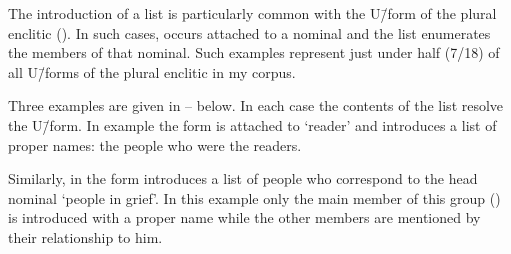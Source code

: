 The introduction of a list is particularly common with
the U\=/form of the plural enclitic  ().
In such cases,  occurs attached to a nominal
and the list enumerates the members of that nominal.
Such examples represent just under half (7/18) of all U\=/forms
of the plural enclitic  in my corpus.

Three examples are given in -- below.
In each case the contents of the list resolve the U\=/form.
In example  the form  is attached to 
`reader' and introduces a list of proper names:
the people who were the readers.

\begin{exe}
	\label{ex:130920-1, 1.32-1.36}
	\begin{xlist}
	\end{xlist}
\end{exe}

Similarly, in  the form 
introduces a list of people who correspond to the head nominal
 `people in grief'.
In this example only the main member of this group ()
is introduced with a proper name while the other members
are mentioned by their relationship to him.

